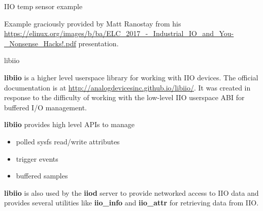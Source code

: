 \begin{frame}
    {IIO temp sensor example}

	Example graciously provided by Matt Ranostay from his \url{https://elinux.org/images/b/ba/ELC_2017_-_Industrial_IO_and_You-_Nonsense_Hacks!.pdf} presentation.

\end{frame}

\begin{frame}
    {libiio}

	\textbf{libiio} is a higher level userspace library for working with IIO devices. The official documentation is at \url{http://analogdevicesinc.github.io/libiio/}. It was created in response to the difficulty of working with the low-level IIO userspace ABI for buffered I/O management.

	\textbf{libiio} provides high level APIs to manage
	\begin{itemize}
		\item polled sysfs read/write attributes
		\item trigger events
		\item buffered samples
	\end{itemize}

	\textbf{libiio} is also used by the \textbf{iiod} server to provide networked access to IIO data and provides several utilities like \textbf{iio\_info} and \textbf{iio\_attr} for retrieving data from IIO.
\end{frame}
